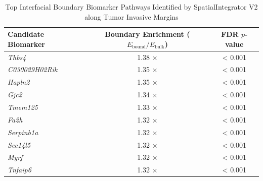 \begin{table}[b]
\centering
\caption{Top Interfacial Boundary Biomarker Pathways Identified by SpatialIntegrator V2 along Tumor Invasive Margins}
\label{tab:v2_boundary_biomarkers}
\begin{tabular}{l c c}
\toprule
\textbf{Candidate Biomarker} & \textbf{Boundary Enrichment ($E_{\text{bound}}/E_{\text{bulk}}$)} & \textbf{FDR $p$-value} \\
\midrule
\textit{Thbs4} & 1.38 $\times$ & < 0.001 \\
\textit{C030029H02Rik} & 1.35 $\times$ & < 0.001 \\
\textit{Hapln2} & 1.35 $\times$ & < 0.001 \\
\textit{Gjc2} & 1.34 $\times$ & < 0.001 \\
\textit{Tmem125} & 1.33 $\times$ & < 0.001 \\
\textit{Fa2h} & 1.32 $\times$ & < 0.001 \\
\textit{Serpinb1a} & 1.32 $\times$ & < 0.001 \\
\textit{Sec14l5} & 1.32 $\times$ & < 0.001 \\
\textit{Myrf} & 1.32 $\times$ & < 0.001 \\
\textit{Tnfaip6} & 1.32 $\times$ & < 0.001 \\
\bottomrule
\end{tabular}
\end{table}
